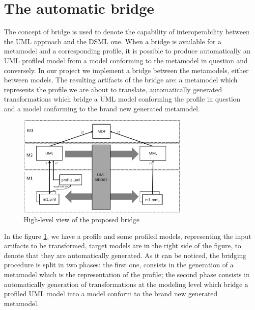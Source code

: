 \section{The automatic bridge}\label{sec:framework}
%
The concept of bridge is used to denote the capability of interoperability between the UML approach and the DSML one. When a bridge is available for a metamodel and a corresponding profile, it is possible to produce automatically an UML profiled model from a model conforming to the metamodel in question and conversely. In our project we implement a bridge between the metamodels, either between models. The resulting artifacts of the bridge are: a metamodel which represents the profile we are about to translate,  automatically generated transformations which bridge a UML model conforming the profile in question and a model conforming to the brand new generated metamodel.
%
\begin{figure}[htbp]
	\centering
		\includegraphics[width=0.75\textwidth]{figures/overall.png}
	\caption{High-level view of the proposed bridge}
	\label{fig:overall}
\end{figure}
%
In the figure \ref{fig:overall},  we have a profile and some profiled models, representing the input artifacts to be transformed, target models are in the right side of the figure, to denote that they are automatically generated. As it can be noticed, the bridging procedure is split in two phases: the first one, consists in the generation of a metamodel which is the representation of the profile; the second phase consists in automatically generation of transformations at the modeling level which bridge a profiled UML model into a model conform to the brand new generated metamodel.

